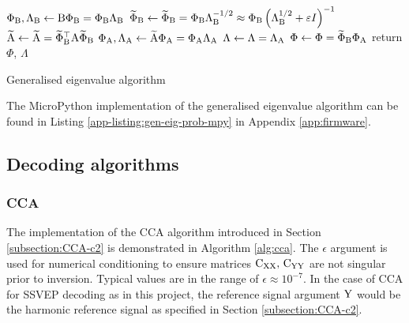 \begin{algorithm}
\begin{algorithmic}
\State $\Phi_{{\textrm{B}}}, \Lambda_{{\textrm{B}}} \gets {\textrm{B}} \Phi_{{\textrm{B}}}=\Phi_{{\textrm{B}}} \Lambda_{{\textrm{B}}}$ 
\State $\widetilde{\Phi}_{{\textrm{B}}} \gets \widetilde{\Phi}_{{\textrm{B}}}=\Phi_{{\textrm{B}}} \Lambda_{{\textrm{B}}}^{-1 / 2} \approx \Phi_{{\textrm{B}}}\left(\Lambda_{{\textrm{B}}}^{1 / 2}+\varepsilon I\right)^{-1}$ 
\State $\widetilde{{\textrm{A}}} \gets \widetilde{{\textrm{A}}}=\widetilde{\Phi}_{{\textrm{B}}}^{\top} {\textrm{A}} \widetilde{\Phi}_{{\textrm{B}}}$ 
\State $\Phi_{{\textrm{A}}}, \Lambda_{{\textrm{A}}} \gets \widetilde{{\textrm{A}}} \Phi_{{\textrm{A}}}=\Phi_{{\textrm{A}}} \Lambda_{{\textrm{A}}}$ 
\State $\Lambda \gets \Lambda=\Lambda_{{\textrm{A}}}$ 
\State $\Phi \gets \Phi=\widetilde{\Phi}_{{\textrm{B}}} \Phi_{{\textrm{A}}}$ 
\State return $\Phi$, $\Lambda$ 
\end{algorithmic}
\caption{Generalised eigenvalue algorithm}
\label{alg:gen-eig-algo}
\end{algorithm}

The MicroPython implementation of the generalised eigenvalue algorithm can be found in Listing \ref{app-listing:gen-eig-prob-mpy} in Appendix \ref{app:firmware}.

\subsection{Decoding algorithms}
\subsubsection{CCA}
The implementation of the CCA algorithm introduced in Section \ref{subsection:CCA-c2} is demonstrated in Algorithm \ref{alg:cca}. The $\epsilon$ argument is used for numerical conditioning to ensure matrices ${\textrm{C}}_{{\textrm{X}}{\textrm{X}}}, \, {\textrm{C}}_{{\textrm{Y}}{\textrm{Y}}}$ are not singular prior to inversion. Typical values are in the range of $\epsilon\approx10^{-7}$. In the case of CCA for SSVEP decoding as in this project, the reference signal argument ${\textrm{Y}}$ would be the harmonic reference signal as specified in Section \ref{subsection:CCA-c2}.

